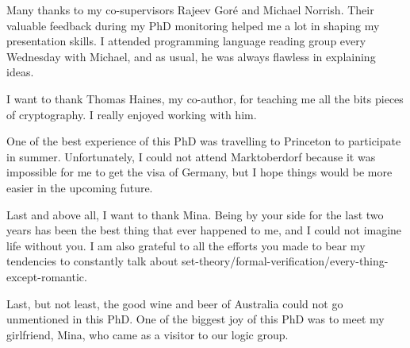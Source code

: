 Many thanks to my co-supervisors Rajeev Gor\'e and Michael Norrish. Their valuable feedback during my PhD monitoring 
helped me a lot in shaping my presentation skills. I attended programming language reading group every Wednesday with  Michael, and as usual, 
he was always flawless in explaining ideas. 
 
 I want to thank Thomas Haines, my co-author,  for teaching me all the bits pieces of cryptography. I really 
 enjoyed working with him. 
 
 One of the best experience of this PhD was travelling to Princeton to participate in summer. 
 Unfortunately, I could not attend Marktoberdorf because it was impossible for me to get the visa of Germany, but I hope
 things would be more easier in the upcoming future. 
 
 Last and above all, I want to thank Mina. Being by your side for the last two years has been the best thing that ever happened to me, and I could not 
 imagine life without you.   I am also grateful to all the efforts you made to bear my tendencies to constantly
  talk about set-theory/formal-verification/every-thing-except-romantic.

 Last, but not least, the good wine and beer of Australia could not go unmentioned in this PhD. 
One of the biggest joy of this PhD was to meet my girlfriend, Mina, who came as a visitor to our logic group. 
